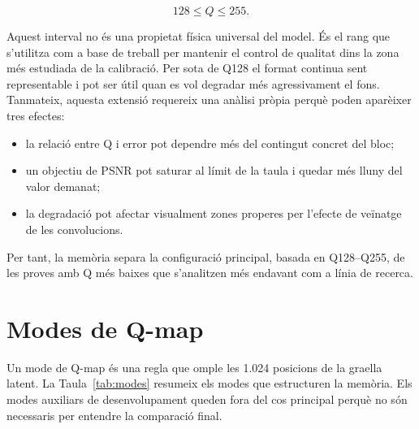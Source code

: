 \begin{equation}
128\leq Q\leq255.
\end{equation}

Aquest interval no és una propietat física universal del model. És el rang que
s'utilitza com a base de treball per mantenir el control de qualitat dins la
zona més estudiada de la calibració. Per sota de Q128 el format continua sent
representable i pot ser útil quan es vol degradar més agressivament el fons.
Tanmateix, aquesta extensió requereix una anàlisi pròpia perquè poden aparèixer
tres efectes:

\begin{itemize}[leftmargin=*]
  \item la relació entre Q i error pot dependre més del contingut concret del
  bloc;
  \item un objectiu de PSNR pot saturar al límit de la taula i quedar més lluny
  del valor demanat;
  \item la degradació pot afectar visualment zones properes per l'efecte de
  veïnatge de les convolucions.
\end{itemize}

Per tant, la memòria separa la configuració principal, basada en Q128--Q255, de
les proves amb Q més baixes que s'analitzen més endavant com a línia de recerca.

\section{Modes de Q-map}\label{sec:modes}

Un mode de Q-map és una regla que omple les 1.024 posicions de la graella
latent. La Taula~\ref{tab:modes} resumeix els modes que estructuren la memòria.
Els modes auxiliars de desenvolupament queden fora del cos principal perquè no
són necessaris per entendre la comparació final.

